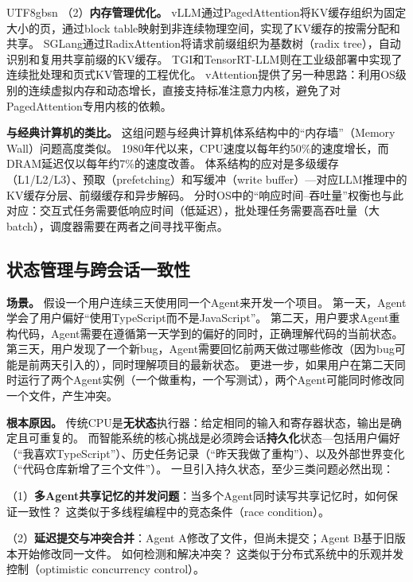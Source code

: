 \documentclass[11pt,a4paper]{article}
\begin{document}
\begin{CJK*}{UTF8}{gbsn}
（2）\textbf{内存管理优化。}
vLLM\cite{kwon2023pagedattention,vllm_docs_2026}通过PagedAttention将KV缓存组织为固定大小的页，通过block table映射到非连续物理空间，实现了KV缓存的按需分配和共享。
SGLang\cite{sglang2024,sglang_docs_2026}通过RadixAttention将请求前缀组织为基数树（radix tree），自动识别和复用共享前缀的KV缓存。
TGI\cite{tgi_docs_2026}和TensorRT-LLM\cite{tensorrtllm_docs_2026}则在工业级部署中实现了连续批处理和页式KV管理的工程优化。
vAttention\cite{prabhu2024vattention}提供了另一种思路：利用OS级别的连续虚拟内存和动态增长，直接支持标准注意力内核，避免了对PagedAttention专用内核的依赖。

\textbf{与经典计算机的类比。}
这组问题与经典计算机体系结构中的``内存墙''（Memory Wall）问题高度类似。
1980年代以来，CPU速度以每年约50\%的速度增长，而DRAM延迟仅以每年约7\%的速度改善\cite{hennessy2017quantitative}。
体系结构的应对是多级缓存（L1/L2/L3）、预取（prefetching）和写缓冲（write buffer）---对应LLM推理中的KV缓存分层、前缀缓存和异步解码。
分时OS中的``响应时间--吞吐量''权衡也与此对应：交互式任务需要低响应时间（低延迟），批处理任务需要高吞吐量（大batch），调度器需要在两者之间寻找平衡点\cite{ostep_2023}。

\subsection{状态管理与跨会话一致性}

\textbf{场景。}
假设一个用户连续三天使用同一个Agent来开发一个项目。
第一天，Agent学会了用户偏好``使用TypeScript而不是JavaScript''。
第二天，用户要求Agent重构代码，Agent需要在遵循第一天学到的偏好的同时，正确理解代码的当前状态。
第三天，用户发现了一个新bug，Agent需要回忆前两天做过哪些修改（因为bug可能是前两天引入的），同时理解项目的最新状态。
更进一步，如果用户在第二天同时运行了两个Agent实例（一个做重构，一个写测试），两个Agent可能同时修改同一个文件，产生冲突。

\textbf{根本原因。}
传统CPU是\textbf{无状态}执行器：给定相同的输入和寄存器状态，输出是确定且可重复的。
而智能系统的核心挑战是必须跨会话\textbf{持久化}状态---包括用户偏好（``我喜欢TypeScript''）、历史任务记录（``昨天我做了重构''）、以及外部世界变化（``代码仓库新增了三个文件''）。
一旦引入持久状态，至少三类问题必然出现：

（1）\textbf{多Agent共享记忆的并发问题}：当多个Agent同时读写共享记忆时，如何保证一致性？
这类似于多线程编程中的竞态条件（race condition）。

（2）\textbf{延迟提交与冲突合并}：Agent A修改了文件，但尚未提交；Agent B基于旧版本开始修改同一文件。
如何检测和解决冲突？
这类似于分布式系统中的乐观并发控制（optimistic concurrency control）。


\end{CJK*}
\end{document}

